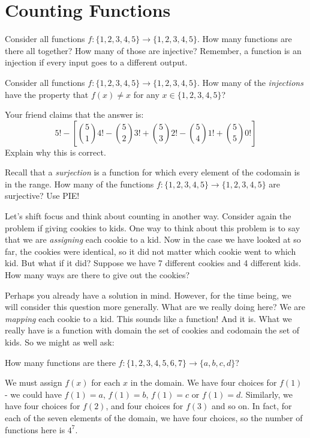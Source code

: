 \documentclass[12pt]{article}
\begin{document}
\section{Counting Functions}

  


\begin{activity}
\begin{questions}
\question Consider all functions $f: \{1,2,3,4,5\} \to \{1,2,3,4,5\}$.  How many functions are there all together?  How many of those are injective?  Remember, a function is an injection if every input goes to a different output.

\question Consider all functions $f: \{1,2,3,4,5\} \to \{1,2,3,4,5\}$.  How many of the {\em injections} have the property that $f(x) \ne x$ for any $x \in \{1,2,3,4,5\}$?

Your friend claims that the answer is:
\[5! - \left[ {5\choose 1}4! - {5 \choose 2}3! + {5\choose 3}2! - {5 \choose 4}1! + {5\choose 5}0! \right]\]
Explain why this is correct.

\question Recall that a {\em surjection} is a function for which every element of the codomain is in the range.  How many of the functions $f: \{1,2,3,4,5\} \to \{1,2,3,4,5\}$ are surjective?  Use PIE!

\end{questions}
\end{activity}

Let's shift focus and think about counting in another way.  Consider again the problem if giving cookies to kids.  One way to think about this problem is to say that we are {\em assigning} each cookie to a kid.  Now in the case we have looked at so far, the cookies were identical, so it did not matter which cookie went to which kid.  But what if it did?  Suppose we have 7 different cookies and 4 different kids.  How many ways are there to give out the cookies?

Perhaps you already have a solution in mind.  However, for the time being, we will consider this question more generally.  What are we really doing here?  We are {\em mapping} each cookie to a kid.  This sounds like a function!  And it is.  What we really have is a function with domain the set of cookies and codomain the set of kids.  So we might as well ask:

\begin{example}
 How many functions are there $f: \{1,2,3,4,5,6,7\} \to \{a,b,c,d\}$?\footnotemark
 \begin{solution}
 	We must assign $f(x)$ for each $x$ in the domain.  We have four choices for $f(1)$ - we could have $f(1) = a$, $f(1) = b$, $f(1) = c$ or $f(1) = d$.  Similarly, we have four choices for $f(2)$, and four choices for $f(3)$ and so on.  In fact, for each of the seven elements of the domain, we have four choices, so the number of functions here is $4^7$.  
 \end{solution}
\end{example}
\end{document}
